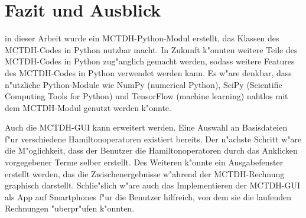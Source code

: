 \chapter{Fazit und Ausblick}

in dieser Arbeit wurde ein MCTDH-Python-Modul erstellt, das Klassen des MCTDH-Codes in Python nutzbar macht.
In Zukunft k"onnten weitere Teile des MCTDH-Codes in Python zug"anglich gemacht werden, sodass weitere Features 
des MCTDH-Codes in Python verwendet werden kann.
Es w"are denkbar, dass n"utzliche Python-Module wie NumPy (numerical Python), SciPy (Scientific Computing Tools for Python)\cite{SciPy}
und TensorFlow (machine learning) \cite{TensorFlow} nahtlos mit dem MCTDH-Modul genutzt werden k"onnte. 

Auch die MCTDH-GUI kann erweitert werden. Eine Auswahl an Basisdateien f"ur verschiedene Hamiltonoperatoren existiert bereits. Der n"achste Schritt
w"are die M"oglichkeit, dass der Benutzer die Hamiltonoperatoren durch das Anklicken vorgegebener Terme selber erstellt. 
Des Weiteren k"onnte ein Ausgabefenster erstellt werden, das die Zwischenergebnisse w"ahrend der MCTDH-Rechnung graphisch darstellt.
Schlie"slich w"are auch das Implementieren der MCTDH-GUI als App auf Smartphones f"ur die Benutzer hilf\-reich, von dem sie die laufenden Rechnungen
"uberpr"ufen k"onnten. 